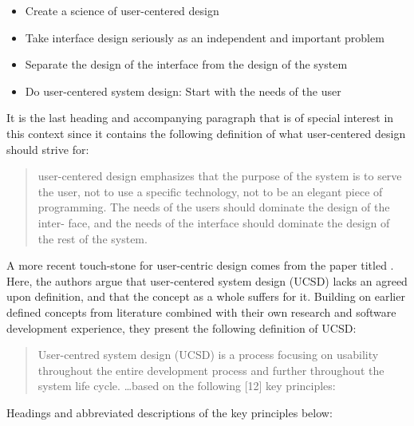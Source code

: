 \begin{itemize}
 \item{Create a science of user-centered design}
 \item{Take interface design seriously as an independent and important problem}
 \item{Separate the design of the interface from the design of the system}
 \item{Do user-centered system design: Start with the needs of the user}
\end{itemize}

It is the last heading and accompanying paragraph that is of special interest
in this context since it contains the following definition of what
user-centered design should strive for\cite[p. 59-61]{citeUserCenteredNorman}:

\begin{quote}
  user-centered design emphasizes that
  the purpose of the system is to serve the user, not to use a
  specific technology, not to be an elegant piece of programming.
  The needs of the users should dominate the design of the inter-
  face, and the needs of the interface should dominate the design
  of the rest of the system.
\end{quote}

A more recent touch-stone for user-centric design comes from the
\citeyear{citeKeyPrinciplesUserCentric} paper titled
\cite{citeKeyPrinciplesUserCentric}.
Here, the authors argue that user-centered system design (UCSD) lacks an
agreed upon definition, and that the concept as a whole suffers for it.
Building on earlier defined concepts from literature combined with their own
research and software development experience, they present the following
definition of UCSD\cite[p. 401]{citeKeyPrinciplesUserCentric}:

\begin{quote}
  User-centred system design (UCSD) is a process focusing on usability
  throughout the entire development process and further throughout the system
  life cycle. \ldots based on the following [12] key principles:
\end{quote}

Headings and abbreviated descriptions of the key principles below:

